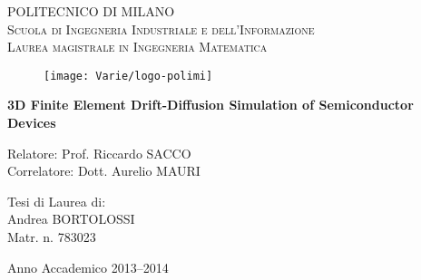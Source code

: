 \begin{titlepage}
\begin{center}
    { \scshape 
    POLITECNICO DI MILANO \\
    Scuola di Ingegneria Industriale e dell'Informazione \\
    Laurea magistrale in Ingegneria Matematica\\
    }
\end{center}

\vspace{0.5cm}

\begin{figure}[h]
		\centering
		\texttt{[image: Varie/logo-polimi]}
\end{figure}

\vspace{1.0cm}
		
\begin{center}
\bf  \LARGE 
3D Finite Element Drift-Diffusion Simulation of Semiconductor Devices
\end{center}

\vspace{2cm}

\begin{flushleft}
Relatore: Prof. Riccardo SACCO \\
Correlatore: Dott. Aurelio MAURI
\end{flushleft}

\vspace{1cm}

\begin{flushright}
		Tesi di Laurea di:\\
		Andrea BORTOLOSSI\\
		Matr. n. 783023\\
\end{flushright}

\vspace{1.5cm}

\begin{center}
Anno Accademico 2013--2014
\end{center}

\end{titlepage}